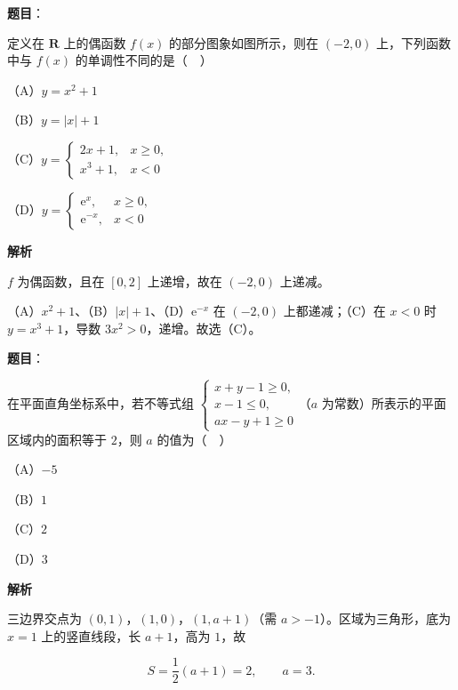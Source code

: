 \begin{answer}

\textbf{题目}：

定义在 $\mathbf R$ 上的偶函数 $f(x)$ 的部分图象如图所示，则在 $(-2,0)$ 上，下列函数中与 $f(x)$ 的单调性不同的是（　）
\nopagebreak[4]
\begin{center}\end{center}
\nopagebreak[4]
（A）$y=x^2+1$

（B）$y=|x|+1$

（C）$y=\begin{cases}2x+1,&x\geqslant0,\\ x^3+1,&x<0\end{cases}$

（D）$y=\begin{cases}\mathrm e^x,&x\geqslant0,\\ \mathrm e^{-x},&x<0\end{cases}$

\textbf{解析}

$f$ 为偶函数，且在 $[0,2]$ 上递增，故在 $(-2,0)$ 上递减。

（A）$x^2+1$、（B）$|x|+1$、（D）$\mathrm e^{-x}$ 在 $(-2,0)$ 上都递减；（C）在 $x<0$ 时 $y=x^3+1$，导数 $3x^2>0$，递增。故选（C）。


\end{answer}
\begin{answer}

\textbf{题目}：

在平面直角坐标系中，若不等式组 $\begin{cases}x+y-1\geqslant0,\\ x-1\leqslant0,\\ ax-y+1\geqslant0\end{cases}$（$a$ 为常数）所表示的平面区域内的面积等于 $2$，则 $a$ 的值为（　）

（A）$-5$

（B）$1$

（C）$2$

（D）$3$

\textbf{解析}

三边界交点为 $(0,1)$，$(1,0)$，$(1,a+1)$（需 $a>-1$）。区域为三角形，底为 $x=1$ 上的竖直线段，长 $a+1$，高为 $1$，故

\nopagebreak[4]
\[S=\frac12(a+1)=2,\qquad a=3.\]


\end{answer}
